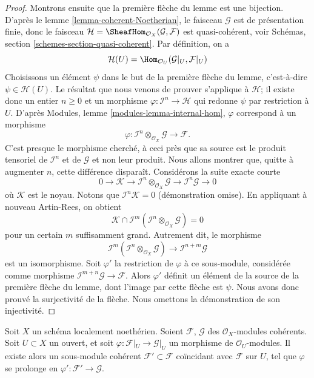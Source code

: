 \begin{proof}
\medskip\noindent
Montrons ensuite que la première flèche du lemme est une bijection. D'après
le lemme \ref{lemma-coherent-Noetherian}, le faisceau $\mathcal{G}$
est de présentation finie, donc le faisceau
$\mathcal{H} = \SheafHom_{\mathcal{O}_X}(\mathcal{G}, \mathcal{F})$
est quasi-cohérent, voir
Schémas, section \ref{schemes-section-quasi-coherent}.
Par définition, on a
$$
\mathcal{H}(U)
=
\Hom_{\mathcal{O}_U}(\mathcal{G}|_U, \mathcal{F}|_U)
$$
Choisissons un élément $\psi$ dans le but de la première flèche du
lemme, c'est-à-dire $\psi \in \mathcal{H}(U)$. Le résultat que nous venons de prouver s'applique
à $\mathcal{H}$; il existe donc un entier $n \geq 0$ et un morphisme
$\varphi : \mathcal{I}^n \to \mathcal{H}$ qui redonne
$\psi$ par restriction à $U$. D'après
Modules, lemme \ref{modules-lemma-internal-hom},
$\varphi$ correspond à un morphisme
$$
\varphi :
\mathcal{I}^n \otimes_{\mathcal{O}_X} \mathcal{G}
\longrightarrow
\mathcal{F}.
$$
C'est presque le morphisme cherché, à ceci près que sa source est
le produit tensoriel de $\mathcal{I}^n$ et de $\mathcal{G}$
et non leur produit. Nous allons montrer que, quitte à augmenter $n$,
cette différence disparaît. Considérons la suite exacte courte
$$
0 \to \mathcal{K} \to
\mathcal{I}^n \otimes_{\mathcal{O}_X} \mathcal{G} \to
\mathcal{I}^n\mathcal{G} \to 0
$$
où $\mathcal{K}$ est le noyau. Notons que
$\mathcal{I}^n\mathcal{K} = 0$ (démonstration omise). En appliquant
à nouveau Artin-Rees, on obtient
$$
\mathcal{K}
\cap
\mathcal{I}^m(\mathcal{I}^n \otimes_{\mathcal{O}_X} \mathcal{G})
=
0
$$
pour un certain $m$ suffisamment grand. Autrement dit, le morphisme
$$
\mathcal{I}^m(\mathcal{I}^n \otimes_{\mathcal{O}_X} \mathcal{G})
\longrightarrow
\mathcal{I}^{n + m}\mathcal{G}
$$
est un isomorphisme. Soit $\varphi'$ la restriction de
$\varphi$ à ce sous-module, considérée comme morphisme
$\mathcal{I}^{m + n}\mathcal{G} \to \mathcal{F}$.
Alors $\varphi'$ définit un élément
de la source de la première flèche du lemme, dont l'image par cette
flèche est $\psi$. Nous avons donc prouvé la surjectivité de la
flèche. Nous omettons la démonstration de son injectivité.
\end{proof}

\begin{lemma}
\label{lemma-extend-coherent}
Soit $X$ un schéma localement noethérien. Soient $\mathcal{F}$, $\mathcal{G}$
des $\mathcal{O}_X$-modules cohérents. Soit $U \subset X$ un ouvert, et
soit $\varphi : \mathcal{F}|_U \to \mathcal{G}|_U$ un morphisme de
$\mathcal{O}_U$-modules. Il existe alors un sous-module
cohérent $\mathcal{F}' \subset \mathcal{F}$ coïncidant avec
$\mathcal{F}$ sur $U$, tel que $\varphi$ se prolonge en
$\varphi' : \mathcal{F}' \to \mathcal{G}$.
\end{lemma}

